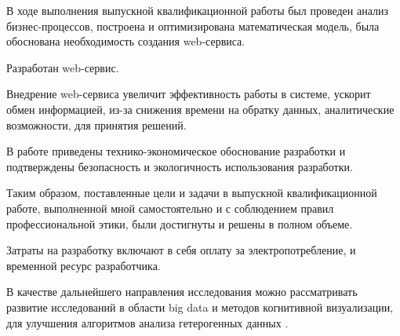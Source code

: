 В ходе выполнения выпускной квалификационной работы был проведен анализ бизнес-процессов, построена и оптимизирована математическая модель, была обоснована необходимость создания web-сервиса.

Разработан web-сервис.

Внедрение web-сервиса увеличит эффективность работы в системе, ускорит обмен информацией, из-за снижения времени на обратку данных, аналитические возможности, для принятия решений.

В работе приведены технико-экономическое обоснование разработки и подтверждены безопасность и экологичность использования разработки.

Таким образом, поставленные цели и задачи в выпускной квалификационной работе, выполненной мной самостоятельно и с соблюдением правил профессиональной этики, были достигнуты и решены в полном объеме.

Затраты на разработку включают в себя оплату за электропотребление, и временной ресурс разработчика.   

В качестве дальнейшего направления исследования можно рассматривать развитие исследований в области big data и методов когнитивной визуализации, для улучшения алгоритмов анализа гетерогенных данных\cite{1.Зенкин1991} \cite{2.Орлов2004}. 

\pagebreak